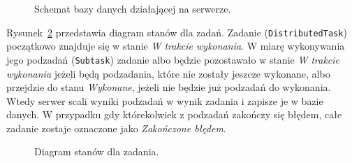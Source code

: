 \documentclass[a4paper,11pt,twoside]{report}
\theoremstyle{definition}
\begin{document}
\begin{figure} 
    \caption{Schemat bazy danych działającej na serwerze.}
    \label{database-schema}
\end{figure}


Rysunek~\ref{task-state-diagram} przedstawia diagram stanów dla zadań.
Zadanie (\texttt{DistributedTask}) początkowo znajduje się w stanie \textit{W trakcie wykonania}. W miarę wykonywania jego podzadań (\texttt{Subtask}) zadanie albo będzie pozostawało w stanie \textit{W trakcie wykonania} jeżeli będą podzadania, które nie zostały jeszcze wykonane, albo przejdzie do stanu \textit{Wykonane}, jeżeli nie będzie już podzadań do wykonania. Wtedy serwer scali wyniki podzadań w wynik zadania i zapisze je w bazie danych. W przypadku gdy którekolwiek z podzadań zakończy się błędem, całe zadanie zostaje oznaczone jako \textit{Zakończone błędem}.


\begin{figure} 
    \caption{Diagram stanów dla zadania.}
    \label{task-state-diagram}
\end{figure}
\end{document}
